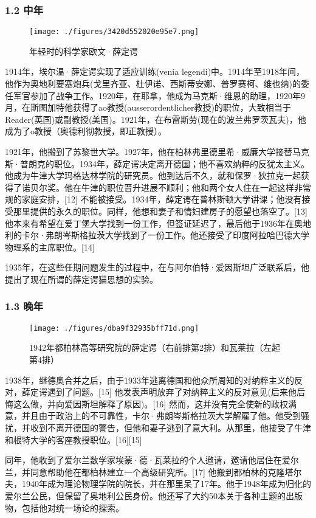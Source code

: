 \subsubsection{1.2 中年}
\begin{figure}[ht]
\centering
\texttt{[image: ./figures/3420d552020e95e7.png]}
\caption{年轻时的科学家欧文·薛定谔} \label{fig_Erwin_1}
\end{figure}
1914年，埃尔温·薛定谔实现了适应训练(venia legendi)中。1914年至1918年间，他作为奥地利要塞炮兵(戈里齐亚、杜伊诺、西斯蒂安娜、普罗赛柯、维也纳)的委任军官参加了战争工作。1920年，在耶拿，他成为马克斯·维恩的助理，1920年9月，在斯图加特他获得了ao教授(ausserordentlicher教授)的职位，大致相当于Reader(英国)或副教授(美国)。1921年，在布雷斯劳(现在的波兰弗罗茨瓦夫)，他成为了o教授（奥德利彻教授，即正教授）。

1921年，他搬到了苏黎世大学。1927年，他在柏林弗里德里希·威廉大学接替马克斯·普朗克的职位。1934年，薛定谔决定离开德国；他不喜欢纳粹的反犹太主义。他成为牛津大学玛格达林学院的研究员。他到达后不久，就和保罗·狄拉克一起获得了诺贝尔奖。他在牛津的职位晋升进展不顺利；他和两个女人住在一起这样非常规的家庭安排，[12] 不能被接受。1934年，薛定谔在普林斯顿大学讲课；他没有接受那里提供的永久的职位。同样，他想和妻子和情妇建房子的愿望也落空了。[13] 他本来有希望在爱丁堡大学找到一份工作，但签证延迟了，最后他于1936年在奥地利的卡尔·弗朗岑斯格拉茨大学找到了一份工作。他还接受了印度阿拉哈巴德大学物理系的主席职位。[14]

1935年，在这些任期问题发生的过程中，在与阿尔伯特·爱因斯坦广泛联系后，他提出了现在所谓的薛定谔猫思想的实验。

\subsubsection{1.3 晚年}
\begin{figure}[ht]
\centering
\texttt{[image: ./figures/dba9f32935bff71d.png]}
\caption{1942年都柏林高等研究院的薛定谔（右前排第2排）和瓦莱拉（左起第4排）} \label{fig_Erwin_2}
\end{figure}
1938年，继德奥合并之后，由于1933年逃离德国和他众所周知的对纳粹主义的反对，薛定谔遇到了问题。[15] 他发表声明放弃了对纳粹主义的反对意见(后来他后悔这么做，并向爱因斯坦解释了原因)。[16] 然而，这并没有完全使新的政权满意，并且由于政治上的不可靠性，卡尔·弗朗岑斯格拉茨大学解雇了他。他受到骚扰，并收到不离开德国的警告，但他和妻子逃到了意大利。从那里，他接受了牛津和根特大学的客座教授职位。[16][15]

同年，他收到了爱尔兰数学家埃蒙·德·瓦莱拉的个人邀请，邀请他居住在爱尔兰，并同意帮助他在都柏林建立一个高级研究所。[17] 他搬到都柏林的克隆塔尔夫，1940年成为理论物理学院的院长，并在那里呆了17年。他于1948年成为归化的爱尔兰公民，但保留了奥地利公民身份。他还写了大约50本关于各种主题的出版物，包括他对统一场论的探索。


